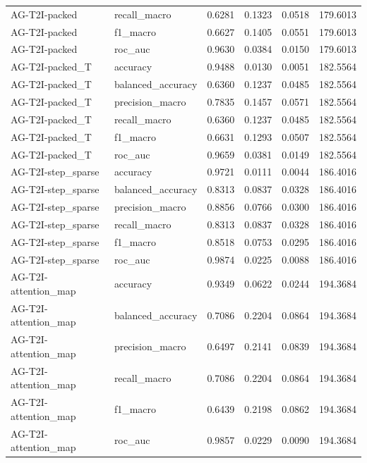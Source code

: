 \begin{tabular}{llrrrr}
AG-T2I-packed & recall_macro & 0.6281 & 0.1323 & 0.0518 & 179.6013 \\
AG-T2I-packed & f1_macro & 0.6627 & 0.1405 & 0.0551 & 179.6013 \\
AG-T2I-packed & roc_auc & 0.9630 & 0.0384 & 0.0150 & 179.6013 \\
AG-T2I-packed_T & accuracy & 0.9488 & 0.0130 & 0.0051 & 182.5564 \\
AG-T2I-packed_T & balanced_accuracy & 0.6360 & 0.1237 & 0.0485 & 182.5564 \\
AG-T2I-packed_T & precision_macro & 0.7835 & 0.1457 & 0.0571 & 182.5564 \\
AG-T2I-packed_T & recall_macro & 0.6360 & 0.1237 & 0.0485 & 182.5564 \\
AG-T2I-packed_T & f1_macro & 0.6631 & 0.1293 & 0.0507 & 182.5564 \\
AG-T2I-packed_T & roc_auc & 0.9659 & 0.0381 & 0.0149 & 182.5564 \\
AG-T2I-step_sparse & accuracy & 0.9721 & 0.0111 & 0.0044 & 186.4016 \\
AG-T2I-step_sparse & balanced_accuracy & 0.8313 & 0.0837 & 0.0328 & 186.4016 \\
AG-T2I-step_sparse & precision_macro & 0.8856 & 0.0766 & 0.0300 & 186.4016 \\
AG-T2I-step_sparse & recall_macro & 0.8313 & 0.0837 & 0.0328 & 186.4016 \\
AG-T2I-step_sparse & f1_macro & 0.8518 & 0.0753 & 0.0295 & 186.4016 \\
AG-T2I-step_sparse & roc_auc & 0.9874 & 0.0225 & 0.0088 & 186.4016 \\
AG-T2I-attention_map & accuracy & 0.9349 & 0.0622 & 0.0244 & 194.3684 \\
AG-T2I-attention_map & balanced_accuracy & 0.7086 & 0.2204 & 0.0864 & 194.3684 \\
AG-T2I-attention_map & precision_macro & 0.6497 & 0.2141 & 0.0839 & 194.3684 \\
AG-T2I-attention_map & recall_macro & 0.7086 & 0.2204 & 0.0864 & 194.3684 \\
AG-T2I-attention_map & f1_macro & 0.6439 & 0.2198 & 0.0862 & 194.3684 \\
AG-T2I-attention_map & roc_auc & 0.9857 & 0.0229 & 0.0090 & 194.3684 \\
\bottomrule
\end{tabular}
